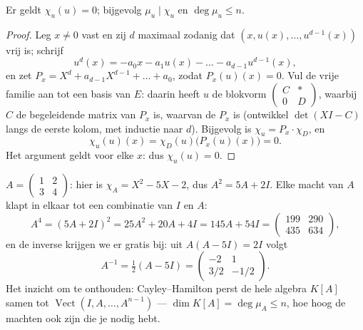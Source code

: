 \begin{theorem}\label{thm:b2:reduction:cayleyhamilton}
Er geldt $\chi_u(u) = 0$; bijgevolg $\mu_u \mid \chi_u$ en $\deg
\mu_u \leq n$.
\end{theorem}

\begin{proof}
Leg $x \neq 0$ vast en zij $d$ maximaal zodanig dat $(x, u(x),
\dots, u^{d-1}(x))$ vrij is; schrijf
\[
u^d(x) = -a_0 x - a_1 u(x) - \dots - a_{d-1}u^{d-1}(x),
\]
en zet $P_x = X^d + a_{d-1}X^{d-1} + \dots + a_0$, zodat $P_x(u)(x)
= 0$. Vul de vrije familie aan tot een basis van $E$: daarin heeft
$u$ de blokvorm $\begin{pmatrix} C & \ast\\ 0 & D\end{pmatrix}$,
waarbij $C$ de begeleidende matrix van $P_x$ is, waarvan de
 $P_x$ is (ontwikkel $\det(XI - C)$ langs de
eerste kolom, met inductie naar $d$). Bijgevolg is $\chi_u = P_x
\cdot \chi_D$, en
\[
\chi_u(u)(x) = \chi_D(u)\bigl(P_x(u)(x)\bigr) = 0 .
\]
Het argument geldt voor elke $x$: dus $\chi_u(u) = 0$.
\end{proof}

\begin{example}\label{ex:b2:reduction:chwork}
$A = \begin{pmatrix} 1 & 2\\ 3 & 4\end{pmatrix}$: hier is $\chi_A =
X^2 - 5X - 2$, dus $A^2 = 5A + 2I$. Elke macht van $A$ klapt in
elkaar tot een combinatie van $I$ en $A$:
\[
A^4 = (5A + 2I)^2 = 25A^2 + 20A + 4I = 145A + 54I =
\begin{pmatrix} 199 & 290\\ 435 & 634\end{pmatrix},
\]
en de inverse krijgen we er gratis bij: uit $A(A - 5I) = 2I$ volgt
\[
A^{-1} = \tfrac12(A - 5I)
= \begin{pmatrix} -2 & 1\\ 3/2 & -1/2\end{pmatrix}.
\]
Het inzicht om te onthouden: Cayley--Hamilton perst de hele algebra
$K[A]$ samen tot $\operatorname{Vect}(I, A, \dots, A^{n-1})$ ---
$\dim K[A] = \deg\mu_A \leq n$, hoe hoog de machten ook zijn die je
nodig hebt.
\end{example}


